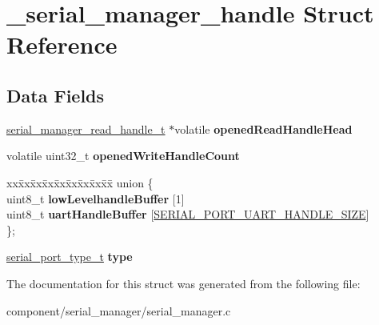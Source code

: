 \hypertarget{struct__serial__manager__handle}{}\section{\+\_\+serial\+\_\+manager\+\_\+handle Struct Reference}
\label{struct__serial__manager__handle}
\subsection*{Data Fields}
\begin{DoxyCompactItemize}
\item 
\mbox{\label{struct__serial__manager__handle_ab4fbee8e3087b8cfd3fe1d7c003fc8b2}} 
\mbox{\hyperlink{struct__serial__manager__send__handle}{serial\+\_\+manager\+\_\+read\+\_\+handle\+\_\+t}} $\ast$volatile {\bfseries opened\+Read\+Handle\+Head}
\item 
\mbox{\label{struct__serial__manager__handle_a151ecfcebede36e37fe3516fd2d337b4}} 
volatile uint32\+\_\+t {\bfseries opened\+Write\+Handle\+Count}
\item 
\mbox{\label{struct__serial__manager__handle_ad6e948bcb92477606945adbe3c2cf031}} 
\begin{tabbing}
xx\=xx\=xx\=xx\=xx\=xx\=xx\=xx\=xx\=\kill
union \{\\
\>uint8\_t {\bfseries lowLevelhandleBuffer} \mbox{[}1\mbox{]}\\
\>uint8\_t {\bfseries uartHandleBuffer} \mbox{[}\mbox{\hyperlink{group__serial__port__uart_ga2109c092d5f72ef7729b0454b40e892f}{SERIAL\_PORT\_UART\_HANDLE\_SIZE}}\mbox{]}\\
\}; \\

\end{tabbing}\item 
\mbox{\label{struct__serial__manager__handle_a03112637c9c98af9974c331c761283a5}} 
\mbox{\hyperlink{group__serialmanager_gaa7dc5f93aacda72d14bb0fa66b0401f3}{serial\+\_\+port\+\_\+type\+\_\+t}} {\bfseries type}
\end{DoxyCompactItemize}


The documentation for this struct was generated from the following file\+:\begin{DoxyCompactItemize}
\item 
component/serial\+\_\+manager/serial\+\_\+manager.\+c\end{DoxyCompactItemize}

